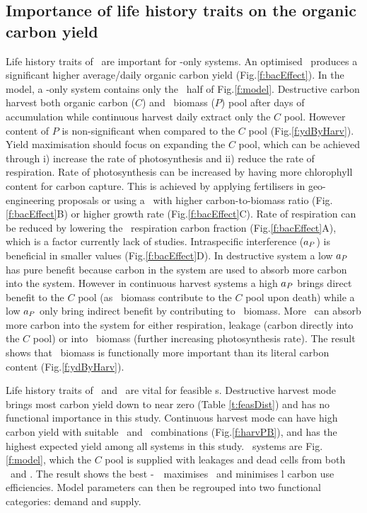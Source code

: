 \documentclass[../thesis.tex]{subfiles} %
\begin{document}
\subsection{Importance of life history traits on the organic carbon yield}
Life history traits of \phy\ are important for \phy-only systems. An optimised \phy\ produces a significant higher average/daily organic carbon yield (Fig.\ref{f:bacEffect}).  In the model, a \phy-only system contains only the \phy\ half of Fig.\ref{f:model}.  Destructive carbon harvest both organic carbon ($C$) and \phy\ biomass ($P$) pool after days of accumulation while continuous harvest daily extract only the $C$ pool.  However content of $P$ is non-significant when compared to the $C$ pool (Fig.\ref{f:ydByHarv}).  Yield maximisation should focus on expanding the $C$ pool, which can be achieved through \Rn{1}) increase the rate of photosynthesis and \Rn{2}) reduce the rate of respiration.  Rate of photosynthesis can be increased by having more chlorophyll content for carbon capture.  This is achieved by applying fertilisers in geo-engineering proposals \autocite{gnanadesikan2008export,lawrence2014efficiency,trick2010iron,kwiatkowski2015atmospheric,lovelock2007ocean} or using a \phy\ with higher carbon-to-biomass ratio (Fig.\ref{f:bacEffect}B) or higher growth rate (Fig.\ref{f:bacEffect}C).  Rate of respiration can be reduced by lowering the \phy\ respiration carbon fraction (Fig.\ref{f:bacEffect}A), which is a factor currently lack of studies.  Intraspecific interference ($a_P$) is beneficial in smaller values (Fig.\ref{f:bacEffect}D).  In destructive system a low $a_P$ has pure benefit because carbon in the system are used to absorb more carbon into the system.  However in continuous harvest systems a high $a_P$ brings direct benefit to the $C$ pool (as \phy\ biomass contribute to the $C$ pool upon death) while a low $a_P$ only bring indirect benefit by contributing to \phy\ biomass.  More \phy\ can absorb more carbon into the system for either respiration, leakage (carbon directly into the $C$ pool) or into \phy\ biomass (further increasing photosynthesis rate).  The result shows that \phy\ biomass is functionally more important than its literal carbon content (Fig.\ref{f:ydByHarv}).

Life history traits of \phy\ and \bac\ are vital for feasible \pbs s.  Destructive harvest mode brings most carbon yield down to near zero (Table \ref{t:feasDist}) and has no functional importance in this study.  Continuous harvest mode can have high carbon yield with suitable \phy\ and \bac\ combinations (Fig.\ref{f:harvPB}), and has the highest expected yield among all systems in this study.  \PBH\ systems are Fig.\ref{f:model}, which the $C$ pool is supplied with leakages and dead cells from both \phy\ and \bac.  The result shows the best \phy-\bac\ \pbs\ maximises \phy\ and minimises \bac l carbon use efficiencies.  Model parameters can then be regrouped into two functional categories: demand and supply.
\end{document}
